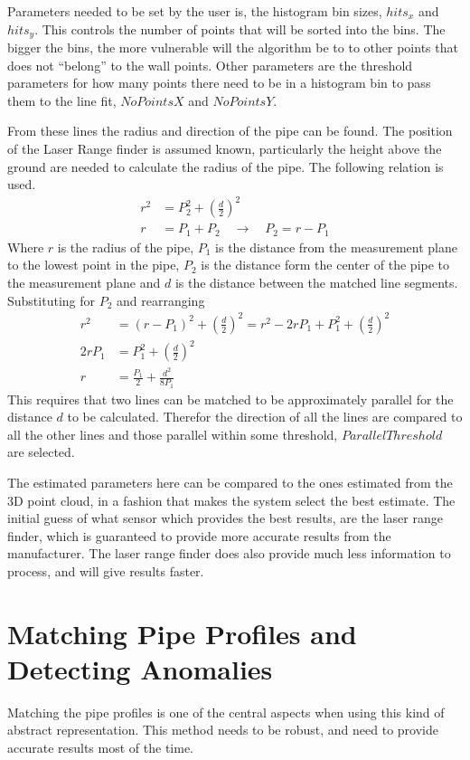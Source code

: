 Parameters needed to be set by the user is, the histogram bin sizes, $hits_x$ and
$hits_y$. This controls the number of points that will be sorted into the bins. The bigger
the bins, the more vulnerable will the algorithm be to to
other points that does not ``belong'' to the wall points. Other parameters are the
threshold parameters for how many points there need to be in a histogram bin to pass them
to the line fit, $NoPointsX$ and $NoPointsY$.

From these lines the radius and direction of the pipe can be found. The position of the
Laser Range finder is assumed known, particularly the height above the ground are needed
to calculate the radius of the pipe. The following relation is used.
\begin{align}
    r^2 &= P_2^2 + \left(\frac{d}{2} \right)^2 \\
    r &= P_1 + P_2  \quad \rightarrow \quad P_2 = r - P_1
\end{align}
Where $r$ is the radius of the pipe, $P_1$ is the distance from the measurement plane to
the lowest point in the pipe, $P_2$ is the distance form the center of the pipe to the
measurement plane and $d$ is the distance between the matched line segments. Substituting
for $P_2$ and rearranging
\begin{equation}
    \begin{aligned}
        r^2& = (r - P_1)^2 + \left(\frac{d}{2}\right)^2 = r^2 - 2 r P_1 + P_1^2 +
        \left(\frac{d}{2}\right)^2 \\
        2 r P_1 &= P_1^2 + \left(\frac{d}{2}\right)^2 \\
        r &= \frac{P_1}{2} + \frac{d^2}{8 P_1}
    \end{aligned}
\end{equation}
This requires that two lines can be matched to be approximately parallel for the distance
$d$ to be calculated. Therefor the direction of all the lines are compared to all the
other lines and those parallel within some threshold, $ParallelThreshold$ are selected.

The estimated parameters here can be compared to the ones estimated from the 3D point
cloud, in a fashion that makes the system select the best estimate. The initial guess of
what sensor which provides the best results, are the laser range finder, which is
guaranteed to provide more accurate results from the manufacturer. The laser range finder
does also provide much less information to process, and will give results faster. 


\section{Matching Pipe Profiles and Detecting Anomalies}
Matching the pipe profiles is one of the central aspects when using this kind of abstract
representation. This method needs to be robust, and need to provide accurate results most
of the time.

